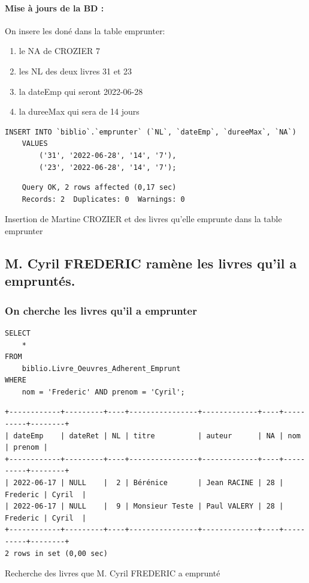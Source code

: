 \documentclass{article}
\begin{document}
\paragraph{Mise à jours de la BD : } On insere les doné dans la table emprunter:
\begin{enumerate}
	\item le NA de CROZIER 7
	\item les NL des deux livres 31 et 23
	\item la dateEmp qui seront 2022-06-28
	\item la dureeMax qui sera de 14 jours
\end{enumerate}
\begin{listing}[H]
\begin{verbatim}
INSERT INTO `biblio`.`emprunter` (`NL`, `dateEmp`, `dureeMax`, `NA`) 
	VALUES 
		('31', '2022-06-28', '14', '7'),
		('23', '2022-06-28', '14', '7');
\end{verbatim}
\begin{verbatim}
	Query OK, 2 rows affected (0,17 sec)
	Records: 2  Duplicates: 0  Warnings: 0
\end{verbatim}
\caption{Insertion de Martine CROZIER et des livres qu'elle emprunte dans la table emprunter}
\end{listing}


\subsection{ M. Cyril FREDERIC ramène les livres qu’il a empruntés.}
\subsubsection{On cherche les livres qu'il a emprunter}	      

\begin{listing}[H]
\begin{verbatim}
SELECT 
    *
FROM
    biblio.Livre_Oeuvres_Adherent_Emprunt
WHERE
    nom = 'Frederic' AND prenom = 'Cyril';
\end{verbatim}
\begin{verbatim}
+------------+---------+----+----------------+-------------+----+----------+--------+
| dateEmp    | dateRet | NL | titre          | auteur      | NA | nom      | prenom |
+------------+---------+----+----------------+-------------+----+----------+--------+
| 2022-06-17 | NULL    |  2 | Bérénice       | Jean RACINE | 28 | Frederic | Cyril  |
| 2022-06-17 | NULL    |  9 | Monsieur Teste | Paul VALERY | 28 | Frederic | Cyril  |
+------------+---------+----+----------------+-------------+----+----------+--------+
2 rows in set (0,00 sec)
\end{verbatim}
\caption{Recherche des livres que M. Cyril FREDERIC a emprunté}
\end{listing}
\end{document}
